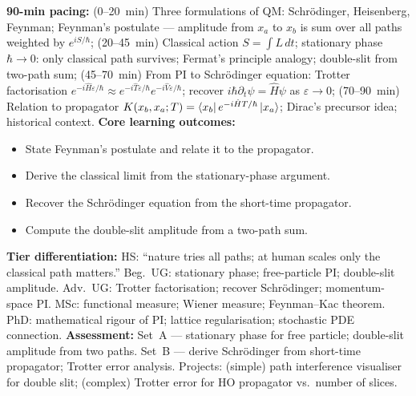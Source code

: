 \documentclass[11pt,a4paper]{article}
\begin{document}
\begin{tcolorbox}[modulebox, title={Module~II.2 --- Lecture L01: Feynman's Postulate}]
\textbf{90-min pacing:} (0--20~min) Three formulations of QM: Schr\"odinger, Heisenberg, Feynman; Feynman's postulate --- amplitude from $x_a$ to $x_b$ is sum over all paths weighted by $e^{iS/\hbar}$; (20--45~min) Classical action $S=\int L\,dt$; stationary phase $\hbar\to 0$: only classical path survives; Fermat's principle analogy; double-slit from two-path sum; (45--70~min) From PI to Schr\"odinger equation: Trotter factorisation $e^{-i\hat{H}\varepsilon/\hbar}\approx e^{-i\hat{T}\varepsilon/\hbar}e^{-i\hat{V}\varepsilon/\hbar}$; recover $i\hbar\partial_t\psi=\hat{H}\psi$ as $\varepsilon\to 0$; (70--90~min) Relation to propagator $K(x_b,x_a;T)=\bra{x_b}e^{-i\hat{H}T/\hbar}\ket{x_a}$; Dirac's precursor idea; historical context.
\medskip\textbf{Core learning outcomes:}
\begin{itemize}[leftmargin=1.4em,topsep=2pt,itemsep=1pt]
  \item State Feynman's postulate and relate it to the propagator.
  \item Derive the classical limit from the stationary-phase argument.
  \item Recover the Schr\"odinger equation from the short-time propagator.
  \item Compute the double-slit amplitude from a two-path sum.
\end{itemize}
\medskip\textbf{Tier differentiation:}
HS: ``nature tries all paths; at human scales only the classical path matters.''
Beg.\ UG: stationary phase; free-particle PI; double-slit amplitude.
Adv.\ UG: Trotter factorisation; recover Schr\"odinger; momentum-space PI.
MSc: functional measure; Wiener measure; Feynman--Kac theorem.
PhD: mathematical rigour of PI; lattice regularisation; stochastic PDE connection.
\medskip\textbf{Assessment:}
Set~A --- stationary phase for free particle; double-slit amplitude from two paths.
Set~B --- derive Schr\"odinger from short-time propagator; Trotter error analysis.
Projects: (simple) path interference visualiser for double slit; (complex) Trotter error for HO propagator vs.\ number of slices.
\end{tcolorbox}

\medskip
\end{document}
